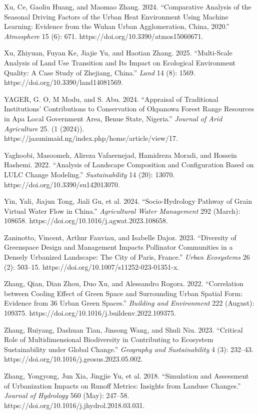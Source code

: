 Xu, Ce, Gaoliu Huang, and Maomao Zhang. 2024. ``Comparative Analysis of the Seasonal Driving Factors of the Urban Heat Environment Using Machine Learning: Evidence from the Wuhan Urban Agglomeration, China, 2020.'' \emph{Atmosphere} 15 (6): 671. https://doi.org/10.3390/atmos15060671.

Xu, Zhiyuan, Fuyan Ke, Jiajie Yu, and Haotian Zhang. 2025. ``Multi-Scale Analysis of Land Use Transition and Its Impact on Ecological Environment Quality: A Case Study of Zhejiang, China.'' \emph{Land} 14 (8): 1569. https://doi.org/10.3390/land14081569.

YAGER, G. O, M Modu, and S. Abu. 2024. ``Appraisal of Traditional Institutions' Contributions to Conservation of Okpanowa Forest Range Resources in Apa Local Government Area, Benue State, Nigeria.'' \emph{Journal of Arid Agriculture} 25. (1 (2024)). https://jaaunimaid.ng/index.php/home/article/view/17.

Yaghoobi, Masoomeh, Alireza Vafaeenejad, Hamidreza Moradi, and Hossein Hashemi. 2022. ``Analysis of Landscape Composition and Configuration Based on LULC Change Modeling.'' \emph{Sustainability} 14 (20): 13070. https://doi.org/10.3390/su142013070.

Yin, Yali, Jiajun Tong, Jiali Gu, et al. 2024. ``Socio-Hydrology Pathway of Grain Virtual Water Flow in China.'' \emph{Agricultural Water Management} 292 (March): 108658. https://doi.org/10.1016/j.agwat.2023.108658.

Zaninotto, Vincent, Arthur Fauviau, and Isabelle Dajoz. 2023. ``Diversity of Greenspace Design and Management Impacts Pollinator Communities in a Densely Urbanized Landscape: The City of Paris, France.'' \emph{Urban Ecosystems} 26 (2): 503--15. https://doi.org/10.1007/s11252-023-01351-x.

Zhang, Qian, Dian Zhou, Duo Xu, and Alessandro Rogora. 2022. ``Correlation between Cooling Effect of Green Space and Surrounding Urban Spatial Form: Evidence from 36 Urban Green Spaces.'' \emph{Building and Environment} 222 (August): 109375. https://doi.org/10.1016/j.buildenv.2022.109375.

Zhang, Ruiyang, Dashuan Tian, Jinsong Wang, and Shuli Niu. 2023. ``Critical Role of Multidimensional Biodiversity in Contributing to Ecosystem Sustainability under Global Change.'' \emph{Geography and Sustainability} 4 (3): 232--43. https://doi.org/10.1016/j.geosus.2023.05.002.

Zhang, Yongyong, Jun Xia, Jingjie Yu, et al. 2018. ``Simulation and Assessment of Urbanization Impacts on Runoff Metrics: Insights from Landuse Changes.'' \emph{Journal of Hydrology} 560 (May): 247--58. https://doi.org/10.1016/j.jhydrol.2018.03.031.

